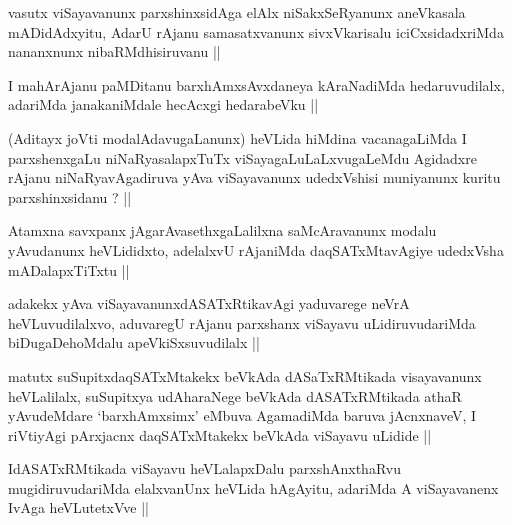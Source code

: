 \begin{artha}
vasutx viSayavanunx parxshinxsidAga elAlx niSakxSeRyanunx aneVkasala
mADidAdxyitu, AdarU rAjanu samasatxvanunx sivxVkarisalu
iciCxsidadxriMda nananxnunx nibaRMdhisiruvanu ||
\end{artha}

\begin{artha}
I mahArAjanu paMDitanu barxhAmxsAvxdaneya kAraNadiMda hedaruvudilalx,
adariMda janakaniMdale hecAcxgi hedarabeVku ||
\end{artha}


\begin{artha}
(Aditayx joVti modalAdavugaLanunx) heVLida hiMdina vacanagaLiMda I
  parxshenxgaLu niNaRyasalapxTuTx viSayagaLuLaLxvugaLeMdu Agidadxre
  rAjanu niNaRyavAgadiruva yAva viSayavanunx udedxVshisi muniyanunx
  kuritu parxshinxsidanu ? ||
\end{artha}


\begin{artha}
Atamxna savxpanx jAgarAvasethxgaLalilxna saMcAravanunx modalu
yAvudanunx heVLididxto, adelalxvU rAjaniMda daqSATxMtavAgiye udedxVsha
mADalapxTiTxtu ||
\end{artha}


\begin{artha}
adakekx yAva viSayavanunxdASATxRtikavAgi yaduvarege neVrA
heVLuvudilalxvo, aduvaregU rAjanu parxshanx viSayavu uLidiruvudariMda
biDugaDehoMdalu apeVkiSxsuvudilalx ||
\end{artha}

\begin{artha}
matutx suSupitxdaqSATxMtakekx beVkAda dASaTxRMtikada visayavanunx
heVLalilalx, suSupitxya udAharaNege beVkAda dASATxRMtikada athaR
yAvudeMdare `barxhAmxsimx' eMbuva AgamadiMda baruva jAcnxnaveV, I
riVtiyAgi pArxjacnx daqSATxMtakekx beVkAda viSayavu uLidide ||
\end{artha}

\begin{artha}
IdASATxRMtikada viSayavu heVLalapxDalu parxshAnxthaRvu
mugidiruvudariMda elalxvanUnx heVLida hAgAyitu, adariMda A
viSayavanenx IvAga heVLutetxVve ||
\end{artha}

